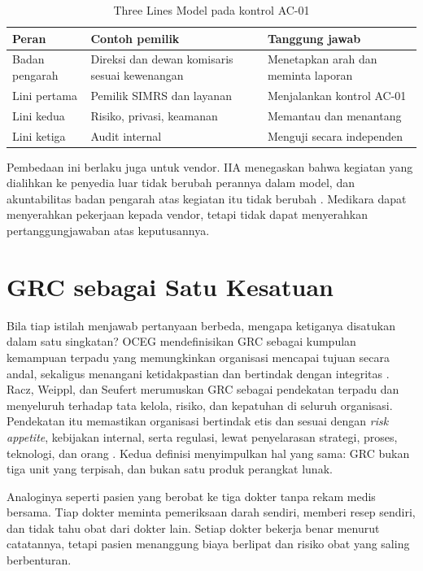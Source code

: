 \begin{table}[!htb]
  \centering\small
  \caption{Three Lines Model pada kontrol AC-01}\label{tab:ch01-tiga-lini}
  \begin{tabularx}{\textwidth}{|>{\raggedright\arraybackslash}p{}|>{\raggedright\arraybackslash}X|>{\raggedright\arraybackslash}X|}
    \hline
    \textbf{Peran} & \textbf{Contoh pemilik} & \textbf{Tanggung jawab} \\ \hline
    Badan pengarah & Direksi dan dewan komisaris sesuai kewenangan & Menetapkan arah dan
    meminta laporan \\ \hline
    Lini pertama & Pemilik SIMRS dan layanan & Menjalankan kontrol AC-01 \\ \hline
    Lini kedua & Risiko, privasi, keamanan & Memantau dan menantang \\ \hline
    Lini ketiga & Audit internal & Menguji secara independen \\ \hline
  \end{tabularx}
\end{table}

Pembedaan ini berlaku juga untuk vendor. IIA menegaskan bahwa kegiatan yang dialihkan ke
penyedia luar tidak berubah perannya dalam model, dan akuntabilitas badan pengarah atas
kegiatan itu tidak berubah \cite{iia-tlm2026}. Medikara dapat menyerahkan pekerjaan kepada
vendor, tetapi tidak dapat menyerahkan pertanggungjawaban atas keputusannya.

\section{GRC sebagai Satu Kesatuan}

Bila tiap istilah menjawab pertanyaan berbeda, mengapa ketiganya disatukan dalam satu
singkatan? OCEG mendefinisikan GRC sebagai kumpulan kemampuan terpadu yang memungkinkan organisasi
mencapai tujuan secara andal, sekaligus menangani ketidakpastian dan bertindak dengan
integritas \cite{c01-oceg-grc}. Racz, Weippl, dan Seufert merumuskan GRC sebagai pendekatan
terpadu dan menyeluruh terhadap tata kelola, risiko, dan kepatuhan di seluruh organisasi.
Pendekatan itu memastikan organisasi bertindak etis dan sesuai dengan \textit{risk
appetite}, kebijakan internal, serta regulasi, lewat penyelarasan strategi, proses,
teknologi, dan orang \cite{c01-racz2010,c01-racz2011}. Kedua definisi menyimpulkan hal yang
sama: GRC bukan tiga unit yang terpisah, dan bukan satu produk perangkat lunak.

Analoginya seperti pasien yang berobat ke tiga dokter tanpa rekam medis bersama. Tiap
dokter meminta pemeriksaan darah sendiri, memberi resep sendiri, dan tidak tahu obat dari
dokter lain. Setiap dokter bekerja benar menurut catatannya, tetapi pasien menanggung
biaya berlipat dan risiko obat yang saling berbenturan.

